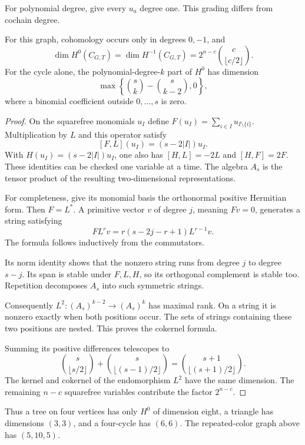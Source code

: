 For polynomial degree, give every $u_a$ degree one.
This grading differs from cochain degree.

\begin{theorem}\label{ei:gio:thm:unicyclic}
For this graph, cohomology occurs only in degrees
$0,-1$, and
\begin{equation}\label{ei:gio:eq:cycle-dimensions}
 \dim H^0(C_{G,T})=\dim H^{-1}(C_{G,T})
 =2^{n-c}\binom{c}{\lfloor c/2\rfloor}.
\end{equation}
For the cycle alone, the polynomial-degree-$k$ part
of $H^0$ has dimension
\[
 \max\left\{\binom{s}{k}-\binom{s}{k-2},0\right\},
\]
where a binomial coefficient outside $0,\ldots,s$ is zero.
\end{theorem}

\begin{proof}
On the squarefree monomials $u_I$ define
$F(u_I)=\sum_{i\in I}u_{I\setminus\{i\}}$.
Multiplication by $L$ and this operator satisfy
\[
 [F,L](u_I)=(s-2|I|)u_I.
\]
With $H(u_I)=(s-2|I|)u_I$, one also has
$[H,L]=-2L$ and $[H,F]=2F$.
These identities can be checked one variable at a
time. The algebra $A_s$ is the tensor product of the resulting
two-dimensional representations.

For completeness, give its monomial basis the
orthonormal positive Hermitian form. Then $F=L^*$.
A primitive vector $v$ of degree $j$, meaning $Fv=0$,
generates a string satisfying
\[
 F L^r v=r(s-2j-r+1)L^{r-1}v.
\]
The formula follows inductively from the commutators.

Its norm identity shows that the nonzero string
runs from degree $j$ to degree $s-j$. Its span is
stable under $F,L,H$, so its orthogonal complement
is stable too. Repetition decomposes $A_s$ into such
symmetric strings.

Consequently $L^2:(A_s)^{k-2}\to(A_s)^k$ has maximal rank.
On a string it is nonzero exactly when both positions occur.
The sets of strings containing these two positions are nested. This proves the cokernel formula.

Summing its positive differences telescopes to
\[
 \binom{s}{\lfloor s/2\rfloor}
 +\binom{s}{\lfloor(s-1)/2\rfloor}
 =\binom{s+1}{\lfloor(s+1)/2\rfloor}.
\]
The kernel and cokernel of the endomorphism $L^2$
have the same dimension. The remaining $n-c$
squarefree variables contribute the factor $2^{n-c}$.
\end{proof}

Thus a tree on four vertices has only $H^0$ of
dimension eight, a triangle has dimensions $(3,3)$,
and a four-cycle has $(6,6)$. The repeated-color
graph above has $(5,10,5)$.

